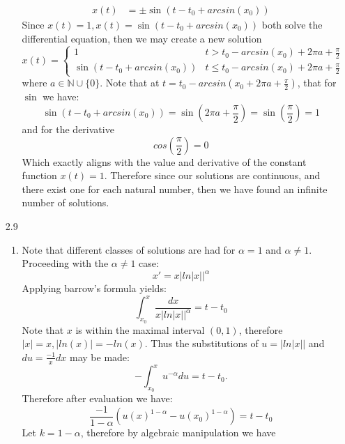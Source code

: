 \documentclass[12pt, letterpaper]{article}
\newcommand{\N}{\mathbb{N}}
\begin{document}
\begin{enumerate}
\begin{enumerate}
\begin{align*}
			x(t) &= \pm \sin(t - t_0 + arcsin(x_0))
		\end{align*}
		Since $x(t) = 1, x(t) = \sin(t - t_0 + arcsin(x_0))$ both solve the differential equation, then we may create a new solution 
		\[
			x(t) = \begin{cases}
				1 & t > t_0 -arcsin(x_0) + 2 \pi a + \frac{\pi}{2}\\
				\sin(t - t_0 + arcsin(x_0)) & t \leq 	t_0 -arcsin(x_0) + 2 \pi a + \frac{\pi}{2}
			\end{cases}
		\]
		where $a \in \N\cup \{0\}$.
		Note that at $t=t_0 -arcsin(x_0+2\pi a + \frac{\pi}{2})$, that for $\sin$ we have:
		\begin{equation*}
			\sin(t - t_0 + arcsin(x_0)) = \sin(2\pi a + \frac{\pi}{2}) = \sin(\frac{\pi}{2}) = 1
		\end{equation*}
		and for the derivative
		\begin{equation*}
		cos(\frac{\pi}{2}) = 0
		\end{equation*}
		Which exactly aligns with the value and derivative of the constant function $x(t) = 1$.  Therefore since our solutions are continuous, and there exist one for each natural number, then we have found an infinite number of solutions.  
	\end{enumerate}
	\item[2.9]
		\begin{enumerate}
			\item Note that different classes of solutions are had for $\alpha = 1$ and $\alpha \neq 1$.  Proceeding with the $\alpha \neq 1$ case:
			\begin{equation*}
			x' = x|ln|x||^\alpha
			\end{equation*}
			Applying barrow's formula yields:
			\begin{equation*}
			\int_{x_0}^x \frac{dx}{x|ln|x||^\alpha} = t-t_0
			\end{equation*}
			Note that $x$ is within the maximal interval $(0,1)$, therefore $|x| = x, |ln(x)| = -ln(x)$.  Thus the substitutions of $u = |ln|x||$ and $du = \frac{-1}{x}dx$ may be made:
			\begin{equation*}
				- \int_{x_0}^x u^{-\alpha}du = t - t_0. 
			\end{equation*}			   
			Therefore after evaluation we have:
			\begin{equation*}
				\frac{-1}{1-\alpha}(u(x)^{1-\alpha}-u(x_0)^{1-\alpha}) = t - t_0
			\end{equation*}
			Let $k = 1 - \alpha$, therefore by algebraic manipulation we have

\end{enumerate}
\end{enumerate}
\end{document}
